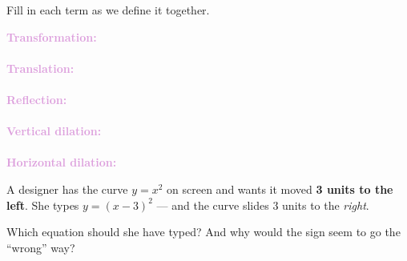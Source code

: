 \documentclass[10pt]{article}
\begin{document}

\vspace{0.12in}

\boxguard
\begin{vocabbox}
Fill in each term as we define it together.
\par\vspace{2pt}
\noindent\textbf{\textcolor{plum}{Transformation:}}\\[1pt]
\writeline\\[3pt]
\noindent\textbf{\textcolor{plum}{Translation:}}\\[1pt]
\writeline\\[3pt]
\noindent\textbf{\textcolor{plum}{Reflection:}}\\[1pt]
\writeline\\[3pt]
\noindent\textbf{\textcolor{plum}{Vertical dilation:}}\\[1pt]
\writeline\\[3pt]
\noindent\textbf{\textcolor{plum}{Horizontal dilation:}}\\[1pt]
\writeline
\end{vocabbox}

\vspace{0.1in}

\boxguard
\begin{hookbox}
A designer has the curve $y = x^2$ on screen and wants it moved \textbf{3 units to the left}.
She types $y = (x - 3)^2$ --- and the curve slides 3 units to the \emph{right}.

Which equation should she have typed? And why would the sign seem to go the ``wrong'' way?
\end{hookbox}
\end{document}
